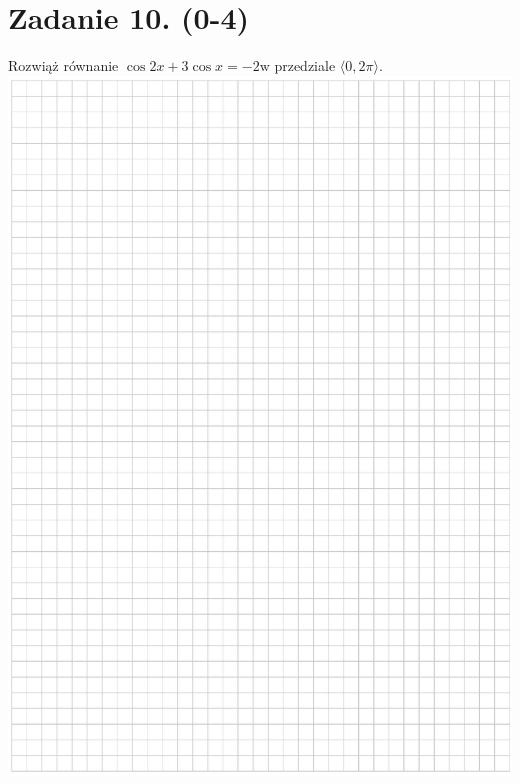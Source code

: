 \documentclass[10pt]{article}
\begin{document}
\section*{Zadanie 10. (0-4)}
Rozwiąż równanie \(\cos 2 x+3 \cos x=-2 \mathrm{w}\) przedziale \(\langle 0,2 \pi\rangle\).\\
\includegraphics[max width=\textwidth, center]{2024_11_21_3120cbc7edd07b3a101fg-08}
\end{document}
